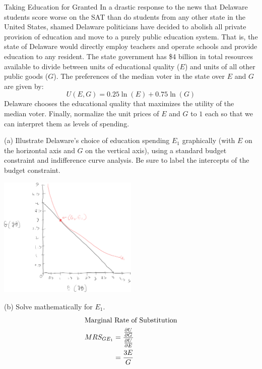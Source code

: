 \documentclass[8pt]{extarticle}
\begin{document}
  \begin{problem}{Taking Education for Granted}
    In a drastic response to the news that Delaware students score worse on the SAT than do students from any other state in the United States, shamed Delaware politicians have decided to abolish all private provision of education and move to a purely public education system. That is, the state of Delaware would directly employ teachers and operate schools and provide education to any resident. The state government has \$4 billion in total resources available to divide between units of educational quality ($E$) and units of all other public goods ($G$). The preferences of the median voter in the state over $E$ and $G$ are given by:
    \[
      U(E,G) = 0.25\ln(E) + 0.75\ln(G)
    \] 
    Delaware chooses the educational quality that maximizes the utility of the median voter. Finally, normalize the unit prices of $E$ and $G$ to $1$ each so that we can interpret them as levels of spending.
    \tcblower
    \begin{problem}{(a)}
      Illustrate Delaware's choice of education spending $E_1$ graphically (with $E$ on the horizontal axis and $G$ on the vertical axis), using a standard budget constraint and indifference curve analysis. Be sure to label the intercepts of the budget constraint.
      \tcblower
      \begin{center}
        \includegraphics[width=0.5\textwidth]{images/3_4_a.png}
      \end{center}
    \end{problem}
    \begin{problem}{(b)}
      Solve mathematically for $E_1$.
      \tcblower
      \begin{align*}
        \shortintertext{Marginal Rate of Substitution}
        MRS_{GE_1} &= \frac{\frac{\partial U}{\partial G}}{\frac{\partial U}{\partial E}}\\
                   &= \frac{3E}{G}\\

\end{align*}
\end{problem}
\end{problem}
\end{document}
